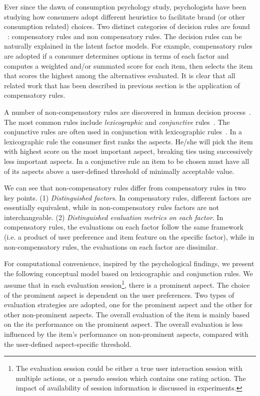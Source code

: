 \documentclass[letterpaper]{article} %
\begin{document}
Ever since the dawn of consumption psychology study, psychologists have been studying how consumers adopt different heuristics to  facilitate brand (or other consumption  related) choices. Two distinct categories of decision rules are found ~\cite{Engel1986Consumer}: compensatory rules and non compensatory rules. The decision rules can be naturally explained in the latent factor models. For example, compensatory rules are adopted if a consumer determines  options in terms of each factor and computes a weighted  and/or summated  score for each item, then selects the item that  scores the highest among  the alternatives evaluated. It is clear that all related work that has been described in previous section is the application of compensatory rules.

A number of non-compensatory rules are discovered in human decision process~\cite{Engel1986Consumer}. The most common rules include \textit{lexicographic} and \textit{conjunctive} rules~\cite{Laroche2003Which}. The conjunctive rules are often used in conjunction with lexicographic rules~\cite{Laroche2003Which}. In a lexicographic rule the consumer first ranks the aspects. He/she will pick the item with highest score on the most important aspect, breaking ties using successively less important aspects. In a conjunctive rule an item to be chosen must have all of its aspects above a user-defined threshold of minimally acceptable value. 

We can see that non-compensatory rules differ from compensatory rules in two key points. (1) \textit{Distinguished factors}. In compensatory rules, different factors are essentially equivalent, while in non-compensatory rules factors are not interchangeable. (2) \textit{Distinguished evaluation metrics on each factor}. In compensatory rules, the evaluations on each factor follow the same framework (i.e. a product of user preference and item feature on the specific factor), while in non-compensatory rules, the evaluations on each factor are dissimilar.  

For computational convenience, inspired by the psychological findings, we present the following conceptual model based on lexicographic and conjunction rules. We assume that in each evaluation session\footnote{The evaluation session could be either a true user interaction session with multiple actions, or a pseudo session which contains one rating action. The impact of availability of session information is discussed in experiments. }, there is a prominent aspect. The choice of the prominent aspect is dependent on the user preferences. Two types of evaluation strategies are adopted, one for the prominent aspect and the other for other non-prominent aspects. The overall evaluation of the item is mainly based on the its performance on the prominent aspect. The overall evaluation is less influenced by the item's performance on non-prominent aspects, compared with the user-defined aspect-specific threshold.
\end{document}
